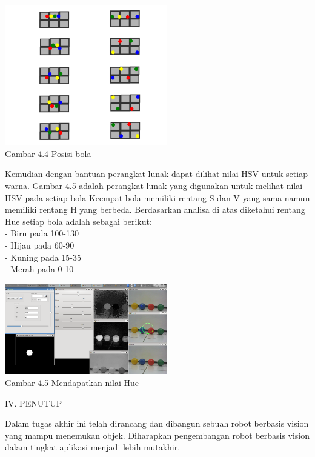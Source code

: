 \documentclass[10pt,journal,compsoc]{IEEEtran}
\begin{document}
  \begin{center}
    \includegraphics[width=200pt]{ball_pos}\\
    Gambar 4.4 Posisi bola
  \end{center}
  
  Kemudian dengan bantuan perangkat lunak dapat dilihat nilai HSV untuk setiap warna.
  Gambar 4.5 adalah perangkat lunak yang digunakan untuk melihat nilai HSV pada setiap bola
  Keempat bola memiliki rentang S dan V yang sama namun memiliki rentang H yang berbeda.
  Berdasarkan analisa di atas diketahui rentang Hue setiap bola adalah sebagai berikut:\\
  - Biru pada 100-130 \\
  - Hijau pada 60-90 \\
  - Kuning pada 15-35 \\
  - Merah pada 0-10 \\

  \begin{center}
    \includegraphics[width=200pt]{ball_color}\\
    Gambar 4.5 Mendapatkan nilai Hue
  \end{center}
  
  \begin{center}
     IV. PENUTUP
  \end{center}
  
  Dalam tugas akhir ini telah dirancang dan dibangun sebuah robot berbasis vision yang mampu menemukan objek. 
  Diharapkan pengembangan robot berbasis vision dalam tingkat aplikasi menjadi lebih mutakhir.
  
\end{document}
